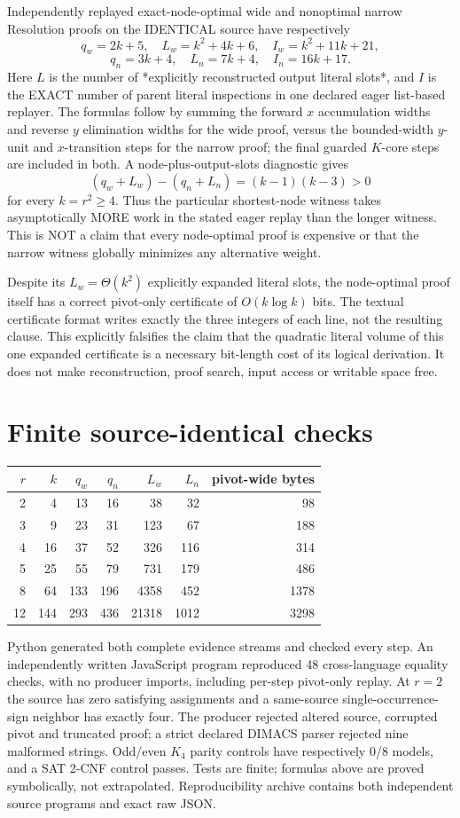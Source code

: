 \documentclass[11pt]{article}
\begin{document}
Independently replayed exact-node-optimal wide and nonoptimal narrow Resolution proofs on the IDENTICAL source have respectively
\[
q_w=2k+5,\quad L_w=k^2+4k+6,\quad I_w=k^2+11k+21,
\]
\[
q_n=3k+4,\quad L_n=7k+4,\quad I_n=16k+17.
\]
Here $L$ is the number of *explicitly reconstructed output literal slots*, and $I$ is the EXACT number of parent literal inspections in one declared eager list-based replayer. The formulas follow by summing the forward $x$ accumulation widths and reverse $y$ elimination widths for the wide proof, versus the bounded-width $y$-unit and $x$-transition steps for the narrow proof; the final guarded $K$-core steps are included in both. A node-plus-output-slots diagnostic gives
\[
(q_w+L_w)-(q_n+L_n)=(k-1)(k-3)>0
\]
for every $k=r^2\ge4$. Thus the particular shortest-node witness takes asymptotically MORE work in the stated eager replay than the longer witness. This is NOT a claim that every node-optimal proof is expensive or that the narrow witness globally minimizes any alternative weight.

Despite its $L_w=\Theta(k^2)$ explicitly expanded literal slots, the node-optimal proof itself has a correct pivot-only certificate of $O(k\log k)$ bits. The textual certificate format writes exactly the three integers of each line, not the resulting clause. This explicitly falsifies the claim that the quadratic literal volume of this one expanded certificate is a necessary bit-length cost of its logical derivation. It does not make reconstruction, proof search, input access or writable space free.

\section*{Finite source-identical checks}
\begin{center}\begin{tabular}{rrrrrrr}\toprule
$r$&$k$&$q_w$&$q_n$&$L_w$&$L_n$&pivot-wide bytes\\\midrule
2&4&13&16&38&32&98\\
3&9&23&31&123&67&188\\
4&16&37&52&326&116&314\\
5&25&55&79&731&179&486\\
8&64&133&196&4358&452&1378\\
12&144&293&436&21318&1012&3298\\\bottomrule\end{tabular}\end{center}
Python generated both complete evidence streams and checked every step. An independently written JavaScript program reproduced 48 cross-language equality checks, with no producer imports, including per-step pivot-only replay. At $r=2$ the source has zero satisfying assignments and a same-source single-occurrence-sign neighbor has exactly four. The producer rejected altered source, corrupted pivot and truncated proof; a strict declared DIMACS parser rejected nine malformed strings. Odd/even $K_4$ parity controls have respectively 0/8 models, and a SAT 2-CNF control passes. Tests are finite; formulas above are proved symbolically, not extrapolated. Reproducibility archive contains both independent source programs and exact raw JSON.
\end{document}
